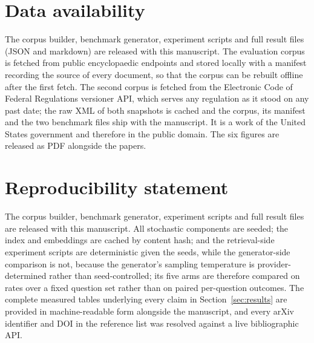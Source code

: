 \documentclass[preprint,3p,times]{elsarticle}
\begin{document}
\section*{Data availability}
The corpus builder, benchmark generator, experiment scripts and full result
files (JSON and markdown) are released with this manuscript. The evaluation
corpus is fetched from public encyclopaedic endpoints and stored locally with a
manifest recording the source of every document, so that the corpus can be
rebuilt offline after the first fetch. The second corpus is fetched from the
Electronic Code of Federal Regulations versioner API, which serves any
regulation as it stood on any past date; the raw XML of both snapshots is
cached and the corpus, its manifest and the two benchmark files ship with the
manuscript. It is a work of the United States government and therefore in the
public domain. The six figures are released as PDF alongside the papers.

\section*{Reproducibility statement}
The corpus builder, benchmark generator, experiment scripts and full result
files are released with this manuscript. All stochastic components are seeded;
the index and embeddings are cached by content hash; and
the retrieval-side experiment scripts are deterministic given the seeds, while the generator-side comparison is not, because the generator's sampling temperature is provider-determined rather than seed-controlled; its five arms are therefore compared on rates over a fixed question set rather than on paired per-question outcomes. The complete measured tables underlying
every claim in Section~\ref{sec:results} are provided in machine-readable form
alongside the manuscript, and every arXiv identifier and DOI in the reference
list was resolved against a live bibliographic API.
\end{document}
